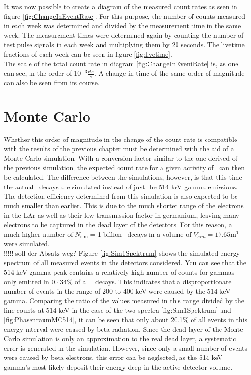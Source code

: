 \documentclass[encoding=utf8,british]{tumphthesis}
\begin{document}
It was now possible to create a diagram of the measured count rates as seen in figure \ref{fig:ChangeInEventRate}.
For this purpose, the number of counts measured in each week was determined and divided by the measurement time in the same week.
The measurement times were determined again by counting the number of test pulse signals in each week and multiplying them by 20 seconds.
The livetime fractions of each week can be seen in figure \ref{fig:livetime}.
\\

The scale of the total count rate in diagram \ref{fig:ChangeInEventRate} is, as one can see, in the order of 10$^{-3} \frac{\unit{cts}}{\unit{s}}$.
A change in time of the same order of magnitude can also be seen from its course.
\\

\section{Monte Carlo}
\label{sec:monteCarlo2}


Whether this order of magnitude in the change of the count rate is compatible with the results of the previous chapter must be determined with the aid of a Monte Carlo simulation.
With a conversion factor similar to the one derived of the previous simulation, the expected count rate for a given activity of \Kr\ can then be calculated.
The difference between the simulations, however, is that this time the actual \Kr\ decays are simulated instead of just the 514 keV gamma emissions.
\\

The detection efficiency determined from this simulation is also expected to be much smaller than earlier.
This is due to the much shorter range of the electrons in the LAr as well as their low transmission factor in germanium, leaving many electrons to be captured in the dead layer of the detectors.
For this reason, a much higher number of $N_{\mathrm{sim}}$ = 1 billion \Kr\ decays in a volume of $V_{sim} = 17.65 \mathrm{m}^3$ were simulated.
\\

!!!!! soll der Absatz weg?
Figure \ref{fig:Sim1Spektrum} shows the simulated energy spectrum of all measured events in the detectors considered.
You can see that the 514 keV gamma peak contains a relatively high number of counts for gammas only emitted in 0.434$\%$ of all \Kr\ decays.
This indicates that a disproportionate number of events in the range of 200 to 400 keV were caused by the 514 keV gamma.
Comparing the ratio of the values measured in this range divided by the line counts at 514 keV in the case of the two spectra \ref{fig:Sim1Spektrum} and \ref{fig:PhasenraumMC514}, it can be seen that only about 20.1$\%$ of all events in this energy interval were caused by beta radiation.
Since the dead layer of the Monte Carlo simulation is only an approximation to the real dead layer, a systematic error is generated in the simulation.
However, since only a small number of events were caused by beta electrons, this error can be neglected, as the 514 keV gamma's most likely deposit their energy deep in the active detector volume. 
\\
\end{document}

